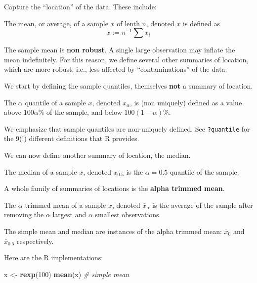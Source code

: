 \documentclass[]{book}
\newenvironment{Shaded}{\begin{snugshade}}{\end{snugshade}}
\newcommand{\KeywordTok}[1]{\textcolor[rgb]{0.13,0.29,0.53}{\textbf{{#1}}}}
\newcommand{\DecValTok}[1]{\textcolor[rgb]{0.00,0.00,0.81}{{#1}}}
\newcommand{\StringTok}[1]{\textcolor[rgb]{0.31,0.60,0.02}{{#1}}}
\newcommand{\CommentTok}[1]{\textcolor[rgb]{0.56,0.35,0.01}{\textit{{#1}}}}
\newcommand{\NormalTok}[1]{{#1}}
\theoremstyle{definition}
\theoremstyle{definition}
\theoremstyle{remark}
\let\BeginKnitrBlock\begin \let\EndKnitrBlock\end
\begin{document}
Capture the ``location'' of the data. These include:

\BeginKnitrBlock{definition}
\protect\hypertarget{def:unnamed-chunk-64}{}{\label{def:unnamed-chunk-64}}The
mean, or average, of a sample \(x\) of lenth \(n\), denoted \(\bar x\)
is defined as \[ \bar x := n^{-1} \sum x_i \]
\EndKnitrBlock{definition}

The sample mean is \textbf{non robust}. A single large observation may
inflate the mean indefinitely. For this reason, we define several other
summaries of location, which are more robust, i.e., less affected by
``contaminations'' of the data.

We start by defining the sample quantiles, themselves \textbf{not} a
summary of location.

\BeginKnitrBlock{definition}
\protect\hypertarget{def:unnamed-chunk-65}{}{\label{def:unnamed-chunk-65}}The
\(\alpha\) quantile of a sample \(x\), denoted \(x_\alpha\), is (non
uniquely) defined as a value above \(100 \alpha \%\) of the sample, and
below \(100 (1-\alpha) \%\).
\EndKnitrBlock{definition}

We emphasize that sample quantiles are non-uniquely defined. See
\texttt{?quantile} for the 9(!) different definitions that R provides.

We can now define another summary of location, the median.

\BeginKnitrBlock{definition}
\protect\hypertarget{def:unnamed-chunk-66}{}{\label{def:unnamed-chunk-66}}The
median of a sample \(x\), denoted \(x_{0.5}\) is the \(\alpha=0.5\)
quantile of the sample.
\EndKnitrBlock{definition}

A whole family of summaries of locations is the \textbf{alpha trimmed
mean}.

\BeginKnitrBlock{definition}
\protect\hypertarget{def:unnamed-chunk-67}{}{\label{def:unnamed-chunk-67}}The
\(\alpha\) trimmed mean of a sample \(x\), denoted \(\bar x_\alpha\) is
the average of the sample after removing the \(\alpha\) largest and
\(\alpha\) smallest observations.
\EndKnitrBlock{definition}

The simple mean and median are instances of the alpha trimmed mean:
\(\bar x_0\) and \(\bar x_{0.5}\) respectively.

Here are the R implementations:

\begin{Shaded}
\begin{Highlighting}[]
\NormalTok{x <-}\StringTok{ }\KeywordTok{rexp}\NormalTok{(}\DecValTok{100}\NormalTok{)}
\KeywordTok{mean}\NormalTok{(x) }\CommentTok{# simple mean}
\end{Highlighting}
\end{Shaded}
\end{document}
